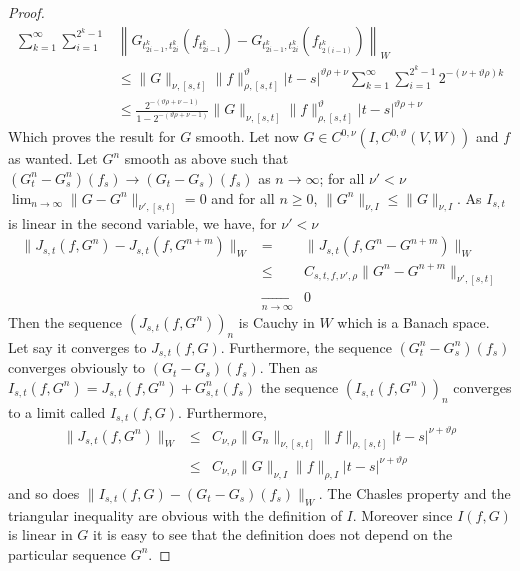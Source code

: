 \documentclass[11pt,a4paper,draft,reqno]{amsart}
\theoremstyle{definition}
\begin{document}
\begin{proof}
\begin{equation*}
\begin{split}
 \sum_{k=1}^{\infty}\sum_{i=1}^{2^k-1} & \left\| G_{t_{2i-1}^k,t_{2i}^k}(f_{t_{2i-1}^k}) - G_{t_{2i-1}^k,t_{2i}^k}(f_{t_{2(i-1)}^k}) \right\|_W
 \\ & \le
 \|G\|_{\nu,[s,t]} \|f\|^\vartheta_{\rho,[s,t]} |t-s|^{\vartheta\rho+\nu}\sum_{k=1}^{\infty}\sum_{i=1}^{2^k-1}2^{-(\nu+\vartheta\rho)k}
 \\ &\le
 \frac{2^{-(\vartheta\rho+\nu-1)}}{1-2^{-(\vartheta\rho+\nu-1)}}\|G\|_{\nu,[s,t]} \|f\|^\vartheta_{\rho,[s,t]} |t-s|^{\vartheta\rho+\nu}
\end{split}
\end{equation*}
Which proves the result for $G$ smooth.
Let now $G\in C^{0,\nu}\left(I, C^{0,\vartheta}(V,W)\right)$ and $f$ as wanted. Let $G^n$ smooth as above such that 
$(G_t^n-G^n_s)(f_s)\to(G_t-G_s)(f_s)$ as $n\to\infty$;
 for all $\nu'<\nu$
 $\lim_{n\to \infty}\|G-G^n\|_{\nu ', [s,t]} = 0$
 and for all $n\ge 0$,  
$\|G^n\|_{\nu,I} \le \|G\|_{\nu,I}$. As $I_{s,t}$ is linear in the second variable, we have, for $\nu'<\nu$
\begin{eqnarray*}
\|J_{s,t}(f,G^n)- J_{s,t}(f,G^{n+m})\|_W
&=&
\|J_{s,t}(f,G^n-G^{n+m})\|_W\\
&\le&
C_{s,t,f,\nu',\rho} \|G^{n}-G^{n+m}\|_{\nu',[s,t]}\\
&\underset{n\to\infty}{\to}&
0
\end{eqnarray*}
Then the sequence $\left(J_{s,t}(f,G^n)\right)_n$ is Cauchy in $W$ which is a Banach space. Let say it converges to $J_{s,t}(f,G)$. Furthermore, the sequence $\left(G_t^n-G_s^n\right)(f_s)$ converges obviously to $\left(G_t-G_s\right)(f_s)$. Then as
$I_{s,t}(f,G^n)=J_{s,t}(f,G^n)+G_{s,t}^n(f_s)$
the sequence $\left(I_{s,t}(f,G^n)\right)_n$ converges to a limit called $I_{s,t}(f,G)$. Furthermore,
\begin{eqnarray*}
\|J_{s,t}(f,G^n)\|_W 
&\le&
 C_{\nu,\rho} \|G_n\|_{\nu,[s,t]} \|f\|_{\rho,[s,t]}|t-s|^{\nu+\vartheta\rho}\\
 &\le&
 C_{\nu,\rho} \|G\|_{\nu,I} \|f\|_{\rho,I}|t-s|^{\nu+\vartheta\rho}
\end{eqnarray*}
and so does $\|I_{s,t}(f,G)-(G_t-G_s)(f_s)\|_W$. The Chasles property and the triangular inequality are obvious with the definition of $I$. Moreover since $I(f,G)$ is linear in $G$ it is easy to see that the definition does not depend on the particular sequence $G^n$.


\end{proof}
\end{document}
